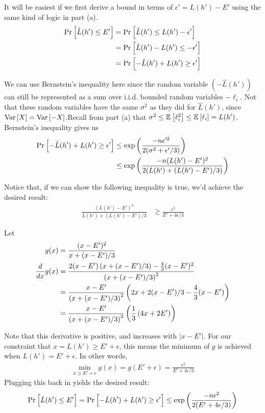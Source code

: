 \documentclass[11pt]{article}
\newcommand{\1}{\mathbb{I}} %
\begin{document}
It will be easiest if we first derive a bound in terms of $\epsilon' = L(h') - E'$ using the same kind of logic in part (a). 
\begin{align}
	\text{Pr}_{}\left[\hat L(h') \leq E'\right] 
		&= \text{Pr}_{}\left[\hat L(h') \leq L(h') - \epsilon'\right] \\
	&= \text{Pr}_{}\left[\hat L(h') - L(h') \leq - \epsilon'\right] \\
	&= \text{Pr}_{}\left[-\hat L(h') + L(h') \geq \epsilon'\right]
\end{align}

We can use Bernstein's inequality here since the random variable $(- \hat L(h'))$ can still be represented as a sum over i.i.d. bounded random variables $-\ell_i$. Not that these random variables have the same $\sigma^2$ as they did for $\hat L(h')$, since $\mathrm{Var}\left[X\right] = \mathrm{Var}\left[-X\right]$.Recall from part (a) that $\sigma^2 \leq \mathbb{E}_{}\left[\ell_i^2\right] \leq \mathbb{E}_{}\left[\ell_i\right] = L(h')$. Bernstein's inequality gives us
\begin{align}
	\text{Pr}_{}\left[-\hat L(h') + L(h') \geq \epsilon'\right]
	&\leq \exp\left(   \frac{-n \epsilon'^2}{2 (\sigma^2 + \epsilon' / 3 ) }  \right) \\
	&\leq  \exp\left(   \frac{-n (L(h') - E')^2}{2 (L(h') + (L(h') - E') / 3 ) }  \right) 
\end{align}

Notice that, if we can show the following inequality is true, we'd achieve the desired result:
\begin{align}
	 \frac{(L(h') - E')^2}{L(h') + (L(h') - E') / 3  }
	 	&\geq \frac{\epsilon^2}{E' + 4\epsilon/3}
\end{align}

Let 
\begin{align}
	g(x) &= \frac{  (x - E')^2 }{ x + (x - E')/3 } \\
	\frac{d}{dx} g(x)
		&=  \frac{  2 (x - E') \left(   x + (x - E')/3  \right)  - \frac{4}{3} (x - E')^2 }{ \left(  x + (x - E')/3 \right)^2 } \\
		&=  \frac{ x - E' }{ \left(  x + (x - E')/3 \right)^2 } \left(   2x + 2 (x - E')/3  - \frac{4}{3} (x - E') \right)   \\
		&=  \frac{ x - E' }{ \left(  x + (x - E')/3 \right)^2 } \left(  \frac{1}{3} \left(  4x + 2E'  \right)  \right) 
\end{align}

Note that this derivative is positive, and increases with $|x - E'|$. For our constraint that $x = L(h') \geq E' + \epsilon$, this means the minimum of $g$ is achieved when $L(h') = E' + \epsilon$. In other words, 
\begin{align}
	\min_{x \geq E' + \epsilon} g(x) = g( E' + \epsilon) =  \frac{\epsilon^2}{E' + 4\epsilon/3}
\end{align}
Plugging this back in yields the desired result:
\begin{align}
	\text{Pr}_{}\left[\hat L(h') \leq E'\right] = \text{Pr}_{}\left[-\hat L(h') + L(h') \geq \epsilon'\right] \leq 
		 \exp\left(   \frac{ -n \epsilon^2 }{ 2(E' + 4\epsilon/3) } \right)
\end{align}
\end{document}
